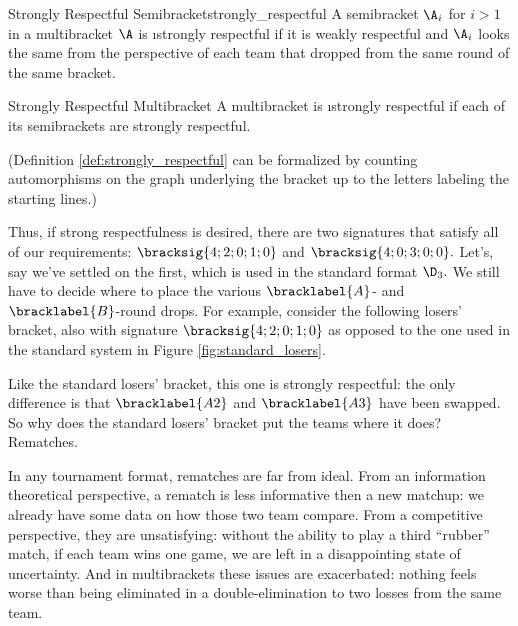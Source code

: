 {    \begin{definition}{Strongly Respectful Semibracket}{strongly_respectful}
        A semibracket $\A_i$ for $i > 1$ in a multibracket $\A$ is \i{strongly respectful} if it is weakly respectful and $\A_i$ looks the same from the perspective of each team that dropped from the same round of the same bracket.
    \end{definition}

    \begin{definition}{Strongly Respectful Multibracket}{}
        A multibracket is \i{strongly respectful} if each of its semibrackets are strongly respectful.
    \end{definition}

    (Definition \ref{def:strongly_respectful} can be formalized by counting automorphisms on the graph underlying the bracket up to the letters labeling the starting lines.)

    Thus, if strong respectfulness is desired, there are two signatures that satisfy all of our requirements: $\bracksig{4;2;0;1;0}$ and $\bracksig{4;0;3;0;0}.$ Let's, say we've settled on the first, which is used in the standard format $\D_3.$ We still have to decide where to place the various $\bracklabel{A}$- and $\bracklabel{B}$-round drops. For example, consider the following losers' bracket, also with signature $\bracksig{4;2;0;1;0}$ as opposed to the one used in the standard system in Figure \ref{fig:standard_losers}.

    

    Like the standard losers' bracket, this one is strongly respectful: the only difference is that $\bracklabel{A2}$ and $\bracklabel{A3}$ have been swapped. So why does the standard losers' bracket put the teams where it does? Rematches.

    In any tournament format, rematches are far from ideal. From an information theoretical perspective, a rematch is less informative then a new matchup: we already have some data on how those two team compare. From a competitive perspective, they are unsatisfying: without the ability to play a third ``rubber'' match, if each team wins one game, we are left in a disappointing state of uncertainty. And in multibrackets these issues are exacerbated: nothing feels worse than being eliminated in a double-elimination to two losses from the same team. 

}
